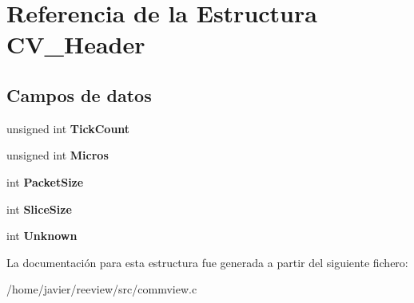 \hypertarget{struct_c_v___header}{
\section{Referencia de la Estructura CV\_\-Header}
\label{struct_c_v___header}
}
\subsection*{Campos de datos}
\begin{DoxyCompactItemize}
\item 
\hypertarget{struct_c_v___header_a4080f9b106600c495a89e5dfda971f3b}{
unsigned int {\bfseries TickCount}}
\label{struct_c_v___header_a4080f9b106600c495a89e5dfda971f3b}

\item 
\hypertarget{struct_c_v___header_a771e67c0e0df1f8a00c4f28921f5a82f}{
unsigned int {\bfseries Micros}}
\label{struct_c_v___header_a771e67c0e0df1f8a00c4f28921f5a82f}

\item 
\hypertarget{struct_c_v___header_a5bc37ee6a8bfc0319d84c071f0e1c7cf}{
int {\bfseries PacketSize}}
\label{struct_c_v___header_a5bc37ee6a8bfc0319d84c071f0e1c7cf}

\item 
\hypertarget{struct_c_v___header_aa5db6b3755c7f0c1bf5871d96400b40b}{
int {\bfseries SliceSize}}
\label{struct_c_v___header_aa5db6b3755c7f0c1bf5871d96400b40b}

\item 
\hypertarget{struct_c_v___header_ab9b440e9e5193bea3cd149fc59f5b25f}{
int {\bfseries Unknown}}
\label{struct_c_v___header_ab9b440e9e5193bea3cd149fc59f5b25f}

\end{DoxyCompactItemize}


La documentación para esta estructura fue generada a partir del siguiente fichero:\begin{DoxyCompactItemize}
\item 
/home/javier/reeview/src/commview.c\end{DoxyCompactItemize}
